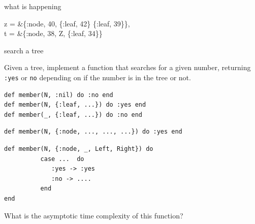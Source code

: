 \begin{frame}{what is happening}

\begin{code}
  z = &\{:node, 40, \{:leaf, 42\} \{:leaf, 39\}\},\\
  t = &\{:node, 38, Z, \{:leaf, 34\}\}
\end{code}
\pause \vspace{20pt}


\end{frame}


\begin{frame}[fragile]{search a tree}

Given a tree, implement a function that searches for a given number,
returning {\tt :yes} or {\tt no} depending on if the number is in the
tree or not.

\pause\vspace{20pt}

\begin{verbatim}
def member(N, :nil) do :no end
def member(N, {:leaf, ...}) do :yes end
def member(_, {:leaf, ...}) do :no end
\end{verbatim}
\pause
\begin{verbatim}
def member(N, {:node, ..., ..., ...}) do :yes end
\end{verbatim}
\pause

\begin{verbatim}
def member(N, {:node, _, Left, Right}) do 
          case ...  do
             :yes -> :yes
             :no -> ....
          end
end
\end{verbatim}

\pause\vspace{20pt}
What is the asymptotic time complexity of this function?
\end{frame}


